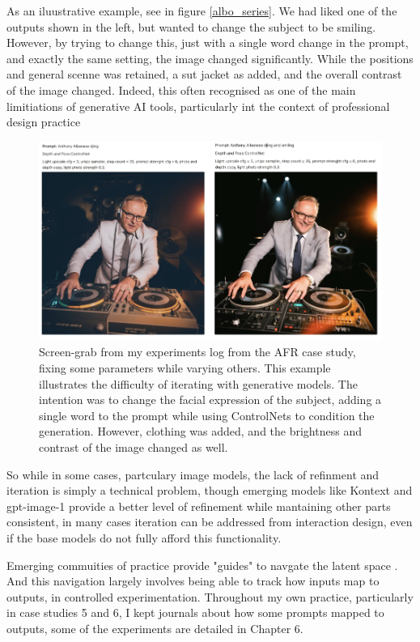 As an iluustrative example, see in figure \ref{albo_series}. We had liked one of  the outputs shown in the left, but wanted to change the subject to be smiling. However, by trying to change this, just with a single word change in the prompt, and exactly the same setting, the image changed significantly. While the positions and general scenne was retained, a  sut jacket as added, and the overall contrast of the image changed. Indeed, this often recognised as one of the main limitiations of generative AI tools, particularly int the context of professional design practice \cite{Park2024-gw}


\begin{figure}
    \centering
    \includegraphics[width=1\linewidth]{alboexperiments.png}
    \caption{Screen-grab from my experiments log from the AFR case study, fixing some parameters while varying others. This example illustrates the difficulty of iterating with generative models. The intention was to change the facial expression of the subject, adding a single word to the prompt while using ControlNets to condition the generation. However, clothing was added, and the brightness and contrast of the image changed as well.}
    \label{fig:albo_series}
\end{figure}

So while in some cases, partculary image models, the lack of refinment and iteration is simply a technical problem, though emerging models like Kontext and gpt-image-1 provide a better level of refinement while mantaining other parts consistent, in many cases iteration can be addressed from interaction design, even if the base models do not fully afford this functionality. 


Emerging commuities of practice provide "guides" to navgate the latent space \cite{Smith2022-dm}. And this navigation largely involves being able to track how inputs map to outputs, in controlled experimentation. Throughout my own practice, particularly in case studies 5 and 6, I kept journals about how some prompts mapped to outputs, some of the experiments are detailed in Chapter 6. 

